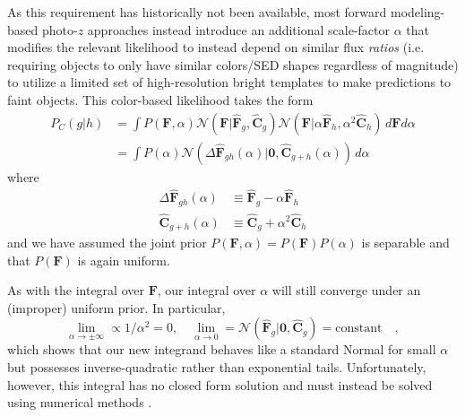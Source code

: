 \documentclass[a4paper,fleqn,usenatbib,english]{mnras}
\newcommand{\pz}{photo-$z$} %
\begin{document}
As this requirement has historically not been available, most forward modeling-based {\pz} approaches instead introduce an additional scale-factor $\alpha$ that modifies the relevant likelihood to instead depend on similar flux \textit{ratios} (i.e. requiring objects to only have similar colors/SED shapes regardless of magnitude) to utilize a limited set of high-resolution bright templates to make predictions to faint objects. This color-based likelihood takes the form
\begin{align}
P_C(g|h) &= \int P(\mathbf{F},\alpha) \mathcal{N}(\mathbf{F}|\mathbf{\hat{F}}_g,\mathbf{\hat{C}}_g) \mathcal{N}(\mathbf{F}|\alpha\mathbf{\hat{F}}_h,\alpha^2\mathbf{\hat{C}}_h)\,d\mathbf{F}d\alpha \nonumber \\
&= \int P(\alpha) \mathcal{N}\left(\Delta\mathbf{\hat{F}}_{gh}(\alpha)|\mathbf{0},\mathbf{\hat{C}}_{g+h}(\alpha)\right)\,d\alpha \label{eq:likelihood_scalefree_general}
\end{align}
where 
\begin{align}
\Delta \mathbf{\hat{F}}_{gh}(\alpha) &\equiv \mathbf{\hat{F}}_{g} - \alpha\mathbf{\hat{F}}_{h} \\
\mathbf{\hat{C}}_{g+h}(\alpha) &\equiv \mathbf{\hat{C}}_{g}+\alpha^2\mathbf{\hat{C}}_{h}
\end{align}
and we have assumed the joint prior $P(\mathbf{F},\alpha)=P(\mathbf{F})P(\alpha)$ is separable and that $P(\mathbf{F})$ is again uniform.

As with the integral over $\mathbf{F}$, our integral over $\alpha$ will still converge under an (improper) uniform prior. In particular,
\begin{equation*}
\lim_{\alpha\rightarrow\pm\infty} \propto 1/\alpha^2 = 0, \quad \lim_{\alpha\rightarrow 0} = \mathcal{N}(\mathbf{\hat{F}}_{g}|\mathbf{0},\mathbf{\hat{C}}_{g}) = \mathrm{constant} \quad ,
\end{equation*}
which shows that our new integrand behaves like a standard Normal for small $\alpha$ but possesses inverse-quadratic rather than exponential tails. Unfortunately, however, this integral has no closed form solution and must instead be solved using numerical methods \citep[see, e.g.,][]{bertsimas+08}.
\end{document}

